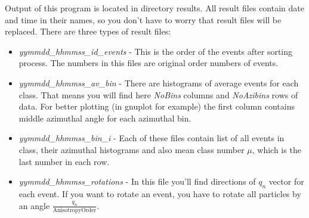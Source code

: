 \documentclass[a4paper]{article}
\begin{document}
Output of this program is located in directory results. All result files contain date and time in their names, so you don't have to worry that result files will be replaced. There are three types of result files:
\begin{itemize}
\item \textit{yymmdd\_hhmmss\_id\_events} - This is the order of the events after sorting process. The numbers in this files are original order numbers of events.
\item \textit{yymmdd\_hhmmss\_av\_bin} - There are histograms of average events for each class. That means you will find here \textit{NoBins} columns and \textit{NoAzibins} rows of data. For better plotting (in gnuplot for example) the first column contains middle azimuthal angle for each azimuthal bin.
\item \textit{yymmdd\_hhmmss\_bin\_i} - Each of these files contain list of all events in class, their azimuthal histograms and also mean class number $\mu$, which is the last number in each row.
\item \textit{yymmdd\_hhmmss\_rotations} - In this file you'll find directions of $q_n$ vector for each event. If you want to rotate an event, you have to rotate all particles by an angle $\frac{q_n}{\mathrm{AnisotropyOrder}}$.
\end{itemize}
\end{document}
